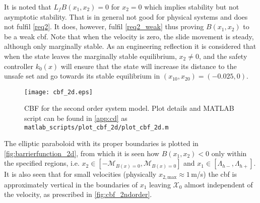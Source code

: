 It is noted that $L_fB(x_1,x_2) = 0$ for $x_2 = 0$ which implies stability but not asymptotic stability. That is in general not good for physical systems and does not fulfil \autoref{req2}. It does, however, fulfil \autoref{req2_weak} thus proving $B(x_1,x_2)$ to be a weak \gls{cbf}. %
Note that when the velocity is zero, the slide movement is steady, although only marginally stable. %
As an engineering reflection it is considered that when the state leaves the marginally stable equilibrium, $x_2 \neq 0$, and the safety controller $k_0(x)$ will ensure that the state will increase its distance to the unsafe set and go towards its stable equilibrium in $(x_{10},x_{20})=(-0.025,0)$. 


\begin{figure}[H]
\hspace*{-2mm}
	\texttt{[image: cbf\_2d.eps]}
	\vspace*{-11mm}
	\caption{CBF for the second order system model. Plot details and MATLAB script can be found in \autoref{app:cd} as \texttt{matlab\_scripts/plot\_cbf\_2d/plot\_cbf\_2d.m}}
	\label{fig:barrierfunction_2d}
\end{figure}
The elliptic paraboloid with its proper boundaries is plotted in \autoref{fig:barrierfunction_2d}, from which it is seen how $B(x_1,x_2)<0$ only within the specified regions, i.e. $x_2 \in [-\mathcal{M}_{B(x)=0},\mathcal{M}_{B(x)=0}]$ and $x_1 \in [\Lambda_{h-},\Lambda_{h+}]$. %
It is also seen that for small velocities (physically $x_{2,\text{max}}\approx 1$\,m/s) the \gls{cbf} is approximately vertical in the boundaries of $x_1$ %
leaving $\mathcal{X}_0$ almost independent of the velocity, as prescribed in \autoref{fig:cbf_2ndorder}.

